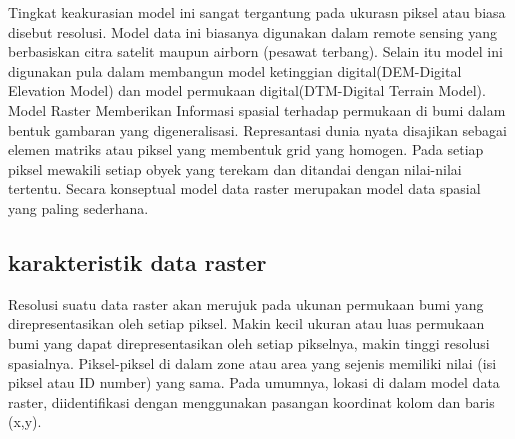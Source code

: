 Tingkat keakurasian model ini sangat tergantung pada ukurasn piksel atau biasa disebut resolusi.
Model data ini biasanya digunakan dalam remote sensing yang berbasiskan citra satelit maupun airborn (pesawat terbang).
Selain itu model ini digunakan pula dalam membangun model ketinggian digital(DEM-Digital Elevation Model) dan model permukaan digital(DTM-Digital Terrain Model).
Model Raster Memberikan Informasi spasial terhadap permukaan di bumi dalam bentuk gambaran yang digeneralisasi.
Represantasi dunia nyata disajikan sebagai elemen matriks atau piksel yang membentuk grid  yang homogen. 
Pada setiap piksel mewakili setiap obyek yang terekam dan ditandai dengan nilai-nilai tertentu.
Secara konseptual model data raster merupakan model data spasial yang paling sederhana. 

\subsection{karakteristik data raster}
Resolusi suatu data raster akan merujuk pada ukunan permukaan bumi yang direpresentasikan oleh setiap piksel. 
Makin kecil ukuran atau luas permukaan bumi yang dapat direpresentasikan oleh setiap pikselnya, 
makin tinggi resolusi spasialnya.
Piksel-piksel di dalam zone atau area yang sejenis memiliki nilai (isi piksel atau ID number) yang sama. 
Pada umumnya, lokasi di dalam model data raster, diidentifikasi dengan menggunakan pasangan koordinat kolom dan baris (x,y).

